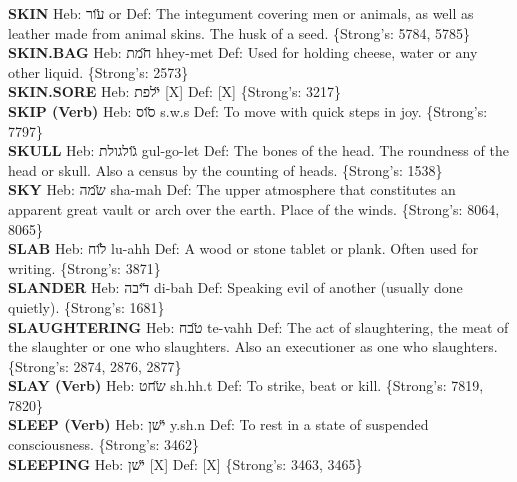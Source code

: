 {\textbf{SKIN} Heb: {\large\H עור} or Def: The integument covering men or animals, as well as leather made from animal skins. The husk of a seed. \{Strong's: 5784, 5785\}\hfill{}\\

\textbf{SKIN.BAG} Heb: {\large\H חמת} hhey-met Def: Used for holding cheese, water or any other liquid. \{Strong's: 2573\}\hfill{}\\

\textbf{SKIN.SORE} Heb: {\large\H ילפת} {[}X{]} Def: {[}X{]} \{Strong's: 3217\}\hfill{}\\

\textbf{SKIP (Verb)} Heb: {\large\H סוס} s.w.s Def: To move with quick steps in joy. \{Strong's: 7797\}\hfill{}\\

\textbf{SKULL} Heb: {\large\H גולגולת} gul-go-let Def: The bones of the head. The roundness of the head or skull. Also a census by the counting of heads. \{Strong's: 1538\}\hfill{}\\

\textbf{SKY} Heb: {\large\H שמה} sha-mah Def: The upper atmosphere that constitutes an apparent great vault or arch over the earth. Place of the winds. \{Strong's: 8064, 8065\}\hfill{}\\

\textbf{SLAB} Heb: {\large\H לוח} lu-ahh Def: A wood or stone tablet or plank. Often used for writing. \{Strong's: 3871\}\hfill{}\\

\textbf{SLANDER} Heb: {\large\H דיבה} di-bah Def: Speaking evil of another (usually done quietly). \{Strong's: 1681\}\hfill{}\\

\textbf{SLAUGHTERING} Heb: {\large\H טבח} te-vahh Def: The act of slaughtering, the meat of the slaughter or one who slaughters. Also an executioner as one who slaughters. \{Strong's: 2874, 2876, 2877\}\hfill{}\\

\textbf{SLAY (Verb)} Heb: {\large\H שחט} sh.hh.t Def: To strike, beat or kill. \{Strong's: 7819, 7820\}\hfill{}\\

\textbf{SLEEP (Verb)} Heb: {\large\H ישן} y.sh.n Def: To rest in a state of suspended consciousness. \{Strong's: 3462\}\hfill{}\\

\textbf{SLEEPING} Heb: {\large\H ישן} {[}X{]} Def: {[}X{]} \{Strong's: 3463, 3465\}\hfill{}\\

}
